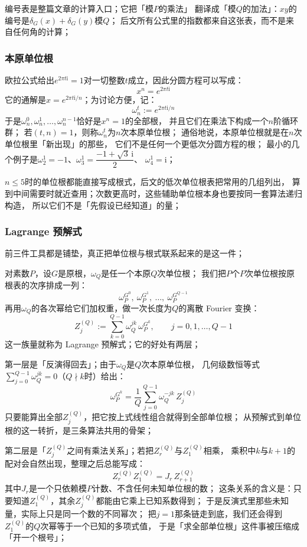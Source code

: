\documentclass[UTF8,a4paper,11pt]{ctexart}
\newcommand{\ii}{\mathrm{i}}
\begin{document}
编号表是整篇文章的计算入口；它把「模$P$的乘法」
翻译成「模$Q$的加法」：$xy$的编号是$\delta_G(x)+\delta_G(y)$模$Q$；
后文所有公式里的指数都来自这张表，而不是来自任何角的计算；\par

\subsubsection{本原单位根}
欧拉公式给出$e^{2\pi t\ii}=1$对一切整数$t$成立，因此分圆方程可以写成：
\[
 x^{n}=e^{2\pi t\ii}
\]
它的通解是$x=e^{2\pi t\ii/n}$；为讨论方便，记：
\[
 \omega_n^t:=e^{2\pi t\ii/n}
\]
于是$\omega_n^0,\omega_n^1,\dots,\omega_n^{n-1}$恰好是$x^n=1$的全部根，
并且它们在乘法下构成一个$n$阶循环群；
若$(t,n)=1$，则称$\omega_n^t$为$n$次本原单位根；
通俗地说，本原单位根就是在$n$次单位根里「新出现」的那些，
它们不是任何一个更低次分圆方程的根；
最小的几个例子是$\omega_2^1=-1$、$\omega_3^1=\dfrac{-1+\sqrt3\,\ii}{2}$、
$\omega_4^1=\ii$；

$n\le5$时的单位根都能直接写成根式，后文的低次单位根表把常用的几组列出，
算到中间需要时就近查用；次数更高时，这些辅助单位根本身也要按同一套算法递归构造，
所以它们不是「先假设已经知道」的量；\par

\subsubsection{Lagrange 预解式}
前三件工具都是铺垫，真正把单位根与根式联系起来的是这一件；

对素数$P$，设$G$是原根，$\omega_Q$是任一个本原$Q$次单位根；
我们把$P$个$P$次单位根按原根表的次序排成一列：
\[
 \omega_P^{G^0},\ \omega_P^{G^1},\ \dots,\ \omega_P^{G^{Q-1}}
\]
再用$\omega_Q$的各次幂给它们加权重，做一次长度为$Q$的离散 Fourier 变换：
\[
 Z^{(Q)}_j:=\sum_{k=0}^{Q-1}\omega_Q^{jk}\,\omega_P^{G^k},\qquad j=0,1,\dots,Q-1
\]
这一族量就称为 Lagrange 预解式；它的好处有两层；\par

第一层是「反演得回去」；由于$\omega_Q$是$Q$次本原单位根，
几何级数恒等式$\sum_{j=0}^{Q-1}\omega_Q^{jk}=0$（$Q\nmid k$时）给出：
\[
 \omega_P^{G^k}=\frac1Q\sum_{j=0}^{Q-1}\omega_Q^{-jk}\,Z^{(Q)}_j
\]
只要能算出全部$Z^{(Q)}_j$，把它按上式线性组合就得到全部单位根；
从预解式到单位根的这一转折，是三条算法共用的骨架；\par

第二层是「$Z^{(Q)}_j$之间有乘法关系」；若把$Z^{(Q)}_r$与$Z^{(Q)}_1$相乘，
乘积中$k$与$k+1$的配对会自然出现，整理之后总能写成：
\[
 Z^{(Q)}_r Z^{(Q)}_1=J_r\,Z^{(Q)}_{r+1}
\]
其中$J_r$是一个只依赖模$P$计数、不含任何未知单位根的数；
这条关系的含义是：只要知道$Z^{(Q)}_1$，其余$Z^{(Q)}_j$都能由它乘上已知系数得到；
于是反演式里那些未知量，实际上只是同一个数的不同幂次；
把$j=1$那条链走到底，我们还会得到$Z^{(Q)}_1$的$Q$次幂等于一个已知的多项式值，
于是「求全部单位根」这件事被压缩成「开一个根号」；
\end{document}
